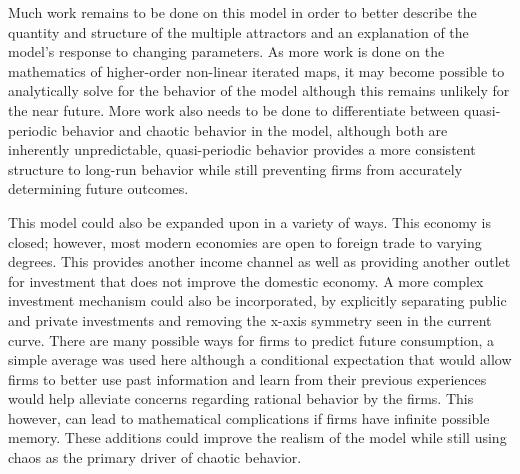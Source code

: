 Much work remains to be done on this model in order to better describe the quantity and structure of the multiple attractors and an explanation of the model's response to changing parameters. As more work is done on the mathematics of higher-order non-linear iterated maps, it may become possible to analytically solve for the behavior of the model although this remains unlikely for the near future. More work also needs to be done to differentiate between quasi-periodic behavior and chaotic behavior in the model, although both are inherently unpredictable, quasi-periodic behavior provides a more consistent structure to long-run behavior while still preventing firms from accurately determining future outcomes.

This model could also be expanded upon in a variety of ways. This economy is closed; however, most modern economies are open to foreign trade to varying degrees. This provides another income channel as well as providing another outlet for investment that does not improve the domestic economy. A more complex investment mechanism could also be incorporated, by explicitly separating public and private investments and removing the x-axis symmetry seen in the current curve. There are many possible ways for firms to predict future consumption, a simple average was used here although a conditional expectation that would allow firms to better use past information and learn from their previous experiences would help alleviate concerns regarding rational behavior by the firms. This however, can lead to mathematical complications if firms have infinite possible memory. These additions could improve the realism of the model while still using chaos as the primary driver of chaotic behavior. 




